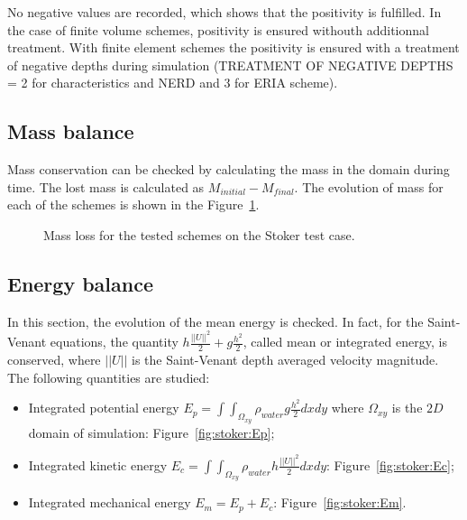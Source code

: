 No negative values are recorded, which shows that the positivity is fulfilled.
In the case of finite volume schemes, positivity is ensured withouth additionnal treatment.
With finite element schemes the positivity is ensured with a treatment of negative depths
during simulation (TREATMENT OF NEGATIVE DEPTHS = 2 for characteristics and NERD and 3 for ERIA scheme).

\subsection{Mass balance}

Mass conservation can be checked by calculating the mass in the domain during time.
The lost mass is calculated as $M_{initial} - M_{final}$.
The evolution of mass for each of the schemes is shown in the Figure~\ref{fig:stoker:VoLTime}.

\begin{figure}[H]
\centering
  \caption{Mass loss for the tested schemes on the Stoker test case.}
\label{fig:stoker:VoLTime}
\end{figure}

\subsection{Energy balance}

In this section, the evolution of the mean energy is checked. In fact, for the Saint-Venant equations,
the quantity $h \frac{||U||^2}{2} + g \frac{h^2}{2}$, called mean or integrated energy, is conserved,
where $||U||$ is the Saint-Venant depth averaged velocity magnitude.
The following quantities are studied:
\begin{itemize}
\item Integrated potential energy \textbf{$E_p =\int\int_{\Omega_{xy}}\rho_{water} g \frac{h^2}{2} dxdy$} where $\Omega_{xy}$ is the $2D$ domain of simulation: Figure~\ref{fig:stoker:Ep};
\item Integrated kinetic energy \textbf{$E_c =\int\int_{\Omega_{xy}} \rho_{water} h \frac{||U||^2}{2} dxdy$}: Figure~\ref{fig:stoker:Ec};
\item Integrated mechanical energy \textbf{$E_m = E_p + E_c$}: Figure~\ref{fig:stoker:Em}.
\end{itemize}

